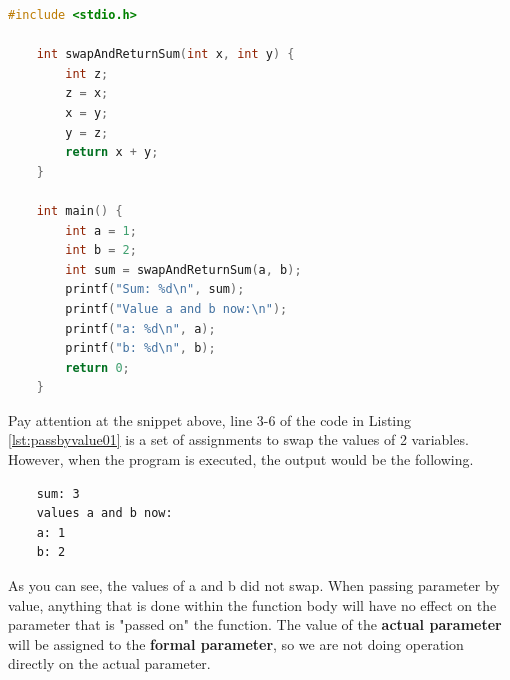 \begin{lstlisting}[language=c,caption = Passing by Value,label=lst:passbyvalue01]
    #include <stdio.h>

    int swapAndReturnSum(int x, int y) {
        int z;
        z = x;
        x = y;
        y = z;
        return x + y;
    }
    
    int main() {
        int a = 1;
        int b = 2;
        int sum = swapAndReturnSum(a, b);
        printf("Sum: %d\n", sum);
        printf("Value a and b now:\n");
        printf("a: %d\n", a);
        printf("b: %d\n", b);
        return 0;
    }
\end{lstlisting}

Pay attention at the snippet above, line 3-6 of the code 
in Listing \ref{lst:passbyvalue01} is a set of assignments 
to swap the values of 2 variables. However, when the program 
is executed, the output would be the following.
\begin{verbatim}
    sum: 3
    values a and b now:
    a: 1
    b: 2
\end{verbatim}
As you can see, the values of a and b did not swap. 
When passing parameter by value, anything that is done 
within the function body will have no effect on the 
parameter that is "passed on" the function. The value of 
the \textbf{actual parameter} will be assigned to the \textbf{formal parameter}, 
so we are not doing operation directly on the actual parameter.


